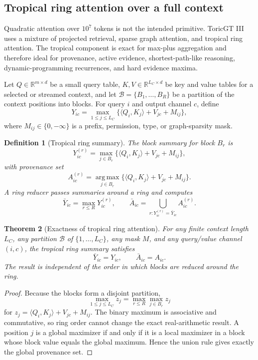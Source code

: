 \documentclass[11pt]{article}
\newtheorem{theorem}{Theorem}[section]
\newtheorem{definition}[theorem]{Definition}
\newcommand{\RR}{\mathbb{R}}
\newcommand{\argmax}{\operatorname*{arg\,max}}
\newcommand{\calB}{\mathcal{B}}
\numberwithin{equation}{section}
\begin{document}
\subsection{Tropical ring attention over a full context}
Quadratic attention over $10^7$ tokens is not the intended primitive. ToricGT III uses a mixture of projected retrieval, sparse graph attention, and tropical ring attention. The tropical component is exact for max-plus aggregation and therefore ideal for provenance, active evidence, shortest-path-like reasoning, dynamic-programming recurrences, and hard evidence maxima.

Let $Q\in\RR^{m\times d}$ be a small query table, $K,V\in\RR^{L_C\times d}$ be key and value tables for a selected or streamed context, and let $\calB=\{B_1,\ldots,B_R\}$ be a partition of the context positions into blocks. For query $i$ and output channel $c$, define
\begin{equation}
Y_{ic}=\max_{1\le j\le L_C}\{\langle Q_i,K_j\rangle+V_{jc}+M_{ij}\},
\end{equation}
where $M_{ij}\in\{0,-\infty\}$ is a prefix, permission, type, or graph-sparsity mask.

\begin{definition}[Tropical ring summary]
The block summary for block $B_r$ is
\begin{equation}
Y^{(r)}_{ic}=\max_{j\in B_r}\{\langle Q_i,K_j\rangle+V_{jc}+M_{ij}\},
\end{equation}
with provenance set
\begin{equation}
A^{(r)}_{ic}=\argmax_{j\in B_r}\{\langle Q_i,K_j\rangle+V_{jc}+M_{ij}\}.
\end{equation}
A ring reducer passes summaries around a ring and computes
\begin{equation}
\bar Y_{ic}=\max_{r\le R}Y^{(r)}_{ic},\qquad \bar A_{ic}=\bigcup_{r:Y^{(r)}_{ic}=\bar Y_{ic}}A^{(r)}_{ic}.
\end{equation}
\end{definition}

\begin{theorem}[Exactness of tropical ring attention]
For any finite context length $L_C$, any partition $\calB$ of $\{1,\ldots,L_C\}$, any mask $M$, and any query/value channel $(i,c)$, the tropical ring summary satisfies
\begin{equation}
\bar Y_{ic}=Y_{ic},\qquad \bar A_{ic}=A_{ic}.
\end{equation}
The result is independent of the order in which blocks are reduced around the ring.
\end{theorem}
\begin{proof}
Because the blocks form a disjoint partition,
\begin{equation}
\max_{1\le j\le L_C} z_j=\max_{r\le R}\max_{j\in B_r} z_j
\end{equation}
for $z_j=\langle Q_i,K_j\rangle+V_{jc}+M_{ij}$. The binary maximum is associative and commutative, so ring order cannot change the exact real-arithmetic result. A position $j$ is a global maximizer if and only if it is a local maximizer in a block whose block value equals the global maximum. Hence the union rule gives exactly the global provenance set.
\end{proof}
\end{document}
